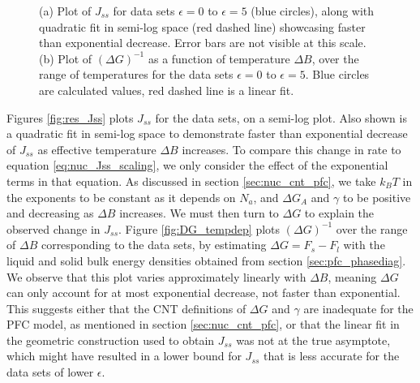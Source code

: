 \begin{figure}[!h]
	\centering
	\caption{(a) Plot of $J_{ss}$ for data sets $\epsilon=0$ to $\epsilon=5$ (blue circles), along with quadratic fit in semi-log space (red dashed line) showcasing faster than exponential decrease. Error bars are not visible at this scale. (b) Plot of $(\Delta G)^{-1}$ as a function of temperature $\Delta B$, over the range of temperatures for the data sets $\epsilon=0$ to $\epsilon=5$. Blue circles are calculated values, red dashed line is a linear fit.}
\end{figure}

Figures \ref{fig:res_Jss} plots $J_{ss}$ for the data sets, on a semi-log plot. Also shown is a quadratic fit in semi-log space to demonstrate faster than exponential decrease of $J_{ss}$ as effective temperature $\Delta B$ increases. To compare this change in rate to equation \ref{eq:nuc_Jss_scaling}, we only consider the effect of the exponential terms in that equation. As discussed in section \ref{sec:nuc_cnt_pfc}, we take $k_B T$ in the exponents to be constant as it depends on $N_a$, and $\Delta G_A$ and $\gamma$ to be positive and decreasing as $\Delta B$ increases. We must then turn to $\Delta G$ to explain the observed change in $J_{ss}$. Figure \ref{fig:DG_tempdep} plots $(\Delta G)^{-1}$ over the range of $\Delta B$ corresponding to the data sets, by estimating $\Delta G = F_s - F_l$ with the liquid and solid bulk energy densities obtained from section \ref{sec:pfc_phasediag}. We observe that this plot varies approximately linearly with $\Delta B$, meaning $\Delta G$ can only account for at most exponential decrease, not faster than exponential. This suggests either that the CNT definitions of $\Delta G$ and $\gamma$ are inadequate for the PFC model, as mentioned in section \ref{sec:nuc_cnt_pfc}, or that the linear fit in the geometric construction used to obtain $J_{ss}$ was not at the true asymptote, which might have resulted in a lower bound for $J_{ss}$ that is less accurate for the data sets of lower $\epsilon$.

